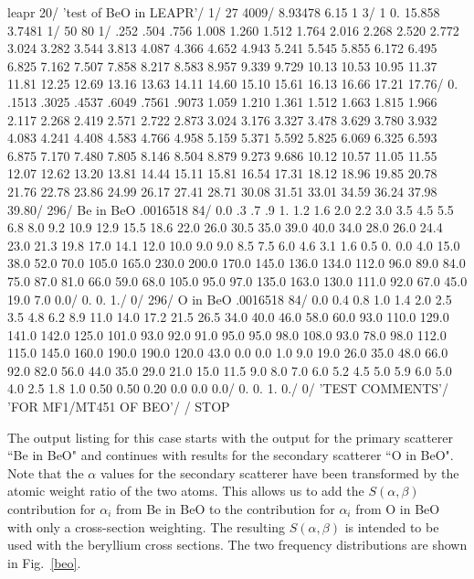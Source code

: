 \newpage
\small
\begin{ccode}

leapr
20/
'test of BeO in LEAPR'/
1/
27 4009/
8.93478 6.15 1 3/
1 0. 15.858 3.7481 1/
50 80 1/
.252 .504 .756 1.008 1.260 1.512 1.764 2.016 2.268 2.520 2.772 3.024
3.282 3.544 3.813 4.087 4.366 4.652 4.943 5.241 5.545 5.855 6.172 6.495
6.825 7.162 7.507 7.858 8.217 8.583 8.957 9.339 9.729 10.13 10.53 10.95
11.37 11.81 12.25 12.69 13.16 13.63 14.11 14.60 15.10 15.61 16.13 16.66
17.21 17.76/
0. .1513 .3025 .4537 .6049 .7561 .9073 1.059 1.210 1.361 1.512 1.663
1.815 1.966 2.117 2.268 2.419 2.571 2.722 2.873 3.024 3.176 3.327 3.478
3.629 3.780 3.932 4.083 4.241 4.408 4.583 4.766 4.958 5.159 5.371 5.592
5.825 6.069 6.325 6.593 6.875 7.170 7.480 7.805 8.146 8.504 8.879 9.273
9.686 10.12 10.57 11.05 11.55 12.07 12.62 13.20 13.81 14.44 15.11 15.81
16.54 17.31 18.12 18.96 19.85 20.78 21.76 22.78 23.86 24.99 26.17 27.41
28.71 30.08 31.51 33.01 34.59 36.24 37.98 39.80/
296/ Be in BeO
.0016518 84/
0.0 .3 .7 .9 1. 1.2 1.6 2.0 2.2 3.0 3.5 4.5 5.5 6.8 8.0 9.2 10.9 12.9
15.5 18.6 22.0 26.0 30.5 35.0 39.0 40.0 34.0 28.0 26.0 24.4 23.0
21.3 19.8 17.0 14.1 12.0 10.0 9.0 9.0 8.5 7.5 6.0 4.6 3.1 1.6
0.5 0. 0.0 4.0 15.0 38.0 52.0 70.0 105.0 165.0 230.0 200.0 170.0
145.0 136.0 134.0 112.0 96.0 89.0 84.0 75.0 87.0 81.0 66.0 59.0
68.0 105.0 95.0 97.0 135.0 163.0 130.0 111.0 92.0 67.0 45.0 19.0
7.0 0.0/
0. 0. 1./
0/
296/ O in BeO
.0016518 84/
0.0 0.4 0.8 1.0 1.4 2.0 2.5 3.5 4.8 6.2 8.9 11.0 14.0 17.2 21.5 26.5
34.0 40.0 46.0 58.0 60.0 93.0 110.0 129.0 141.0 142.0 125.0 101.0
93.0 92.0 91.0 95.0 95.0 98.0 108.0 93.0 78.0 98.0 112.0 115.0 145.0
160.0 190.0 190.0 120.0 43.0 0.0 0.0 1.0 9.0 19.0 26.0 35.0 48.0 66.0
92.0 82.0 56.0 44.0 35.0 29.0 21.0 15.0 11.5 9.0 8.0 7.0 6.0 5.2
4.5 5.0 5.9 6.0 5.0 4.0 2.5 1.8 1.0 0.50 0.50 0.20 0.0 0.0 0.0/
0. 0. 1. 0./
0/
'TEST COMMENTS'/
'FOR MF1/MT451 OF BEO'/
/
STOP

\end{ccode}
\normalsize

The output listing for this case starts with the output for the primary
scatterer ``Be in BeO" and continues with results for the secondary
scatterer ``O in BeO".  Note that the $\alpha$ values for the secondary
scatterer have been transformed by the atomic weight ratio of the two
atoms.  This allows us to add the $S(\alpha,\beta)$ contribution for
$\alpha_i$ from Be in BeO to the contribution for $\alpha_i$ from
O in BeO with only a cross-section weighting.  The resulting
$S(\alpha,\beta)$ is intended to be used with the beryllium cross sections.
The two frequency distributions are shown in Fig.~\ref{beo}.

